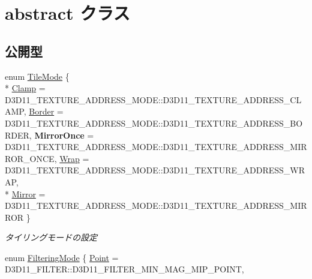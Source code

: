 \hypertarget{class_a_p_i_1_1abstract}{}\section{abstract クラス}
\label{class_a_p_i_1_1abstract}
\subsection*{公開型}
\begin{DoxyCompactItemize}
\item 
enum \hyperlink{class_a_p_i_1_1abstract_a0a6f8b1d41f00f3b6bd7566adbcf4f36}{Tile\+Mode} \{ \\*
\hyperlink{class_a_p_i_1_1abstract_a0a6f8b1d41f00f3b6bd7566adbcf4f36a65cd6695b7f90c094cad51f9d69a1cbe}{Clamp} = D3\+D11\+\_\+\+T\+E\+X\+T\+U\+R\+E\+\_\+\+A\+D\+D\+R\+E\+S\+S\+\_\+\+M\+O\+DE\+:\+:D3\+D11\+\_\+\+T\+E\+X\+T\+U\+R\+E\+\_\+\+A\+D\+D\+R\+E\+S\+S\+\_\+\+C\+L\+A\+MP, 
\hyperlink{class_a_p_i_1_1abstract_a0a6f8b1d41f00f3b6bd7566adbcf4f36aa69f0f49b99456743880469971b657e5}{Border} = D3\+D11\+\_\+\+T\+E\+X\+T\+U\+R\+E\+\_\+\+A\+D\+D\+R\+E\+S\+S\+\_\+\+M\+O\+DE\+:\+:D3\+D11\+\_\+\+T\+E\+X\+T\+U\+R\+E\+\_\+\+A\+D\+D\+R\+E\+S\+S\+\_\+\+B\+O\+R\+D\+ER, 
{\bfseries Mirror\+Once} = D3\+D11\+\_\+\+T\+E\+X\+T\+U\+R\+E\+\_\+\+A\+D\+D\+R\+E\+S\+S\+\_\+\+M\+O\+DE\+:\+:D3\+D11\+\_\+\+T\+E\+X\+T\+U\+R\+E\+\_\+\+A\+D\+D\+R\+E\+S\+S\+\_\+\+M\+I\+R\+R\+O\+R\+\_\+\+O\+N\+CE, 
\hyperlink{class_a_p_i_1_1abstract_a0a6f8b1d41f00f3b6bd7566adbcf4f36a7794c24dd1265ef91cd516a6a2fa40a5}{Wrap} = D3\+D11\+\_\+\+T\+E\+X\+T\+U\+R\+E\+\_\+\+A\+D\+D\+R\+E\+S\+S\+\_\+\+M\+O\+DE\+:\+:D3\+D11\+\_\+\+T\+E\+X\+T\+U\+R\+E\+\_\+\+A\+D\+D\+R\+E\+S\+S\+\_\+\+W\+R\+AP, 
\\*
\hyperlink{class_a_p_i_1_1abstract_a0a6f8b1d41f00f3b6bd7566adbcf4f36a938cfe42fc80a4916f2e6eda40959e9a}{Mirror} = D3\+D11\+\_\+\+T\+E\+X\+T\+U\+R\+E\+\_\+\+A\+D\+D\+R\+E\+S\+S\+\_\+\+M\+O\+DE\+:\+:D3\+D11\+\_\+\+T\+E\+X\+T\+U\+R\+E\+\_\+\+A\+D\+D\+R\+E\+S\+S\+\_\+\+M\+I\+R\+R\+OR
 \}\begin{DoxyCompactList}\small\item\em タイリングモードの設定 \end{DoxyCompactList}
\item 
enum \hyperlink{class_a_p_i_1_1abstract_a520ef65de715096fdca5c71afa9273a1}{Filtering\+Mode} \{ \hyperlink{class_a_p_i_1_1abstract_a520ef65de715096fdca5c71afa9273a1a5b577e188dc4657a3e573fb2dae1a924}{Point} = D3\+D11\+\_\+\+F\+I\+L\+T\+ER\+:\+:D3\+D11\+\_\+\+F\+I\+L\+T\+E\+R\+\_\+\+M\+I\+N\+\_\+\+M\+A\+G\+\_\+\+M\+I\+P\+\_\+\+P\+O\+I\+NT, 

\end{DoxyCompactItemize}
